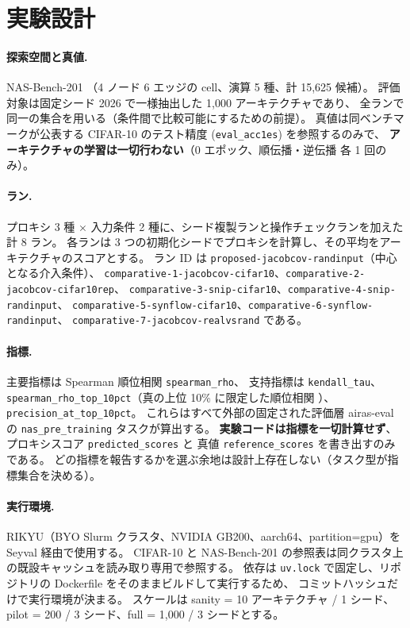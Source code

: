 \documentclass[11pt]{article}
\begin{document}
\section{実験設計}
\label{sec:setup}

\paragraph{探索空間と真値.}
NAS-Bench-201 \cite{dong2020nasbench201}（4 ノード 6 エッジの cell、演算 5 種、計 15{,}625 候補）。
評価対象は固定シード 2026 で一様抽出した 1{,}000 アーキテクチャであり、
全ランで同一の集合を用いる（条件間で比較可能にするための前提）。
真値は同ベンチマークが公表する CIFAR-10 のテスト精度 (\texttt{eval\_acc1es}) を参照するのみで、
\textbf{アーキテクチャの学習は一切行わない}（0 エポック、順伝播・逆伝播 各 1 回のみ）。

\paragraph{ラン.}
プロキシ 3 種 $\times$ 入力条件 2 種に、シード複製ランと操作チェックランを加えた計 8 ラン。
各ランは 3 つの初期化シードでプロキシを計算し、その平均をアーキテクチャのスコアとする。
ラン ID は \texttt{proposed-jacobcov-randinput}（中心となる介入条件）、
\texttt{comparative-1-jacobcov-cifar10}、\texttt{comparative-2-jacobcov-cifar10rep}、
\texttt{comparative-3-snip-cifar10}、\texttt{comparative-4-snip-randinput}、
\texttt{comparative-5-synflow-cifar10}、\texttt{comparative-6-synflow-randinput}、
\texttt{comparative-7-jacobcov-realvsrand} である。

\paragraph{指標.}
主要指標は Spearman 順位相関 \texttt{spearman\_rho}、
支持指標は \texttt{kendall\_tau}、\texttt{spearman\_rho\_top\_10pct}（真の上位 10\% に限定した順位相関
\cite{krishnakumar2022nbsz}）、\texttt{precision\_at\_top\_10pct}。
これらはすべて外部の固定された評価層 airas-eval の \texttt{nas\_pre\_training} タスクが算出する。
\textbf{実験コードは指標を一切計算せず}、プロキシスコア \texttt{predicted\_scores} と
真値 \texttt{reference\_scores} を書き出すのみである。
どの指標を報告するかを選ぶ余地は設計上存在しない（タスク型が指標集合を決める）。

\paragraph{実行環境.}
RIKYU（BYO Slurm クラスタ、NVIDIA GB200、aarch64、partition=gpu）を Seyval 経由で使用する。
CIFAR-10 と NAS-Bench-201 の参照表は同クラスタ上の既設キャッシュを読み取り専用で参照する。
依存は \texttt{uv.lock} で固定し、リポジトリの Dockerfile をそのままビルドして実行するため、
コミットハッシュだけで実行環境が決まる。
スケールは sanity = 10 アーキテクチャ / 1 シード、pilot = 200 / 3 シード、full = 1{,}000 / 3 シードとする。
\end{document}

